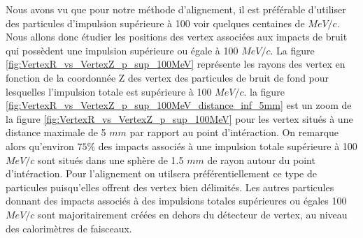 %   

  \medskip
  
  Nous avons vu que pour notre m\'ethode d'alignement, il est pr\'ef\'erable d'utiliser des particules d'impulsion sup\'erieure \`a 100 voir quelques centaines de $MeV/c$. Nous allons donc \'etudier les positions des vertex associ\'ees aux impacts de bruit qui poss\`edent une impulsion sup\'erieure ou \'egale \`a 100 $MeV/c$. La figure \ref{fig:VertexR_vs_VertexZ_p_sup_100MeV} repr\'esente les rayons des vertex en fonction de la coordonn\'ee Z des vertex des particules de bruit de fond pour lesquelles l'impulsion totale est sup\'erieure \`a 100 $MeV/c$. la figure \ref{fig:VertexR_vs_VertexZ_p_sup_100MeV_distance_inf_5mm} est un zoom de la figure \ref{fig:VertexR_vs_VertexZ_p_sup_100MeV} pour les vertex situ\'es \`a une distance maximale de 5 $mm$ par rapport au point d'int\'eraction. On remarque alors qu'environ $75\%$ des impacts associ\'es \`a une impulsion totale sup\'erieure \`a 100 $MeV/c$ sont situ\'es dans une sph\`ere de 1.5 $mm$ de rayon autour du point d'int\'eraction. Pour l'alignement on utilsera pr\'ef\'erentiellement ce type de particules puisqu'elles offrent des vertex bien d\'elimit\'es. Les autres particules donnant des impacts associ\'es \`a des impulsions totales sup\'erieures ou \'egales 100 $MeV/c$ sont majoritairement cr\'e\'ees en dehors du d\'etecteur de vertex, au niveau des calorim\`etres de faisceaux.
   
